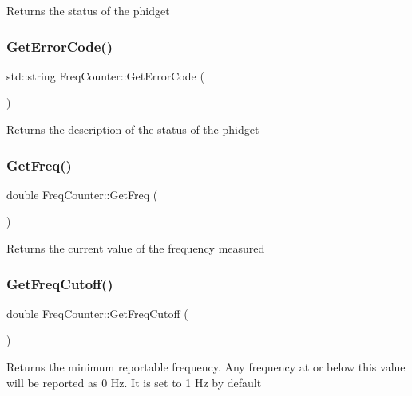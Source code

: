 Returns the status of the phidget\mbox{\label{classFreqCounter_a871e331baa9ea906213ccd4a9dac272f}} 
\subsubsection{\texorpdfstring{Get\+Error\+Code()}{GetErrorCode()}}
{\footnotesize\ttfamily std\+::string Freq\+Counter\+::\+Get\+Error\+Code (\begin{DoxyParamCaption}{ }\end{DoxyParamCaption})\hspace{0.3cm}{\ttfamily [inline]}}

Returns the description of the status of the phidget\mbox{\label{classFreqCounter_a07abdc2bc8a2cff4cf7276085d700b65}} 
\subsubsection{\texorpdfstring{Get\+Freq()}{GetFreq()}}
{\footnotesize\ttfamily double Freq\+Counter\+::\+Get\+Freq (\begin{DoxyParamCaption}{ }\end{DoxyParamCaption})\hspace{0.3cm}{\ttfamily [inline]}}

Returns the current value of the frequency measured\mbox{\label{classFreqCounter_acdaf2ade3385851d88dcc69d4107aded}} 
\subsubsection{\texorpdfstring{Get\+Freq\+Cutoff()}{GetFreqCutoff()}}
{\footnotesize\ttfamily double Freq\+Counter\+::\+Get\+Freq\+Cutoff (\begin{DoxyParamCaption}{ }\end{DoxyParamCaption})\hspace{0.3cm}{\ttfamily [inline]}}

Returns the minimum reportable frequency. Any frequency at or below this value will be reported as 0 Hz. It is set to 1 Hz by default\mbox{\label{classFreqCounter_a144146cca0604f0f6ce61297c8d36026}} 
